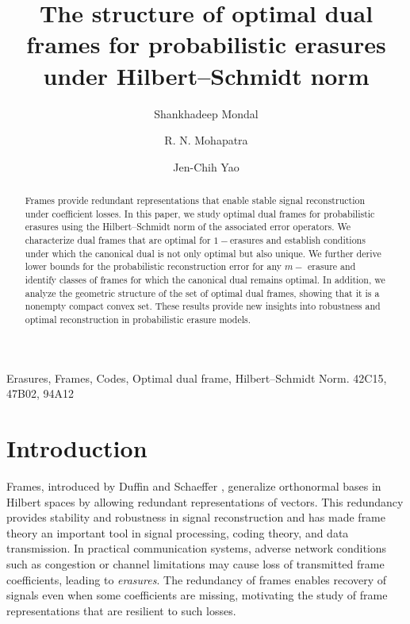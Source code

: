 \documentclass[final,1p,times]{elsarticle}
\begin{document}
\begin{frontmatter}



\title{The structure of optimal dual frames for probabilistic erasures under  Hilbert--Schmidt norm }


\author[shan]{Shankhadeep Mondal}
\author[ram]{R. N. Mohapatra}
\author[yao]{Jen-Chih Yao}




\address{Department of Mathematics, University of Central Florida}
\address{Department of Mathematics, University of Central Florida}
\address{Center for General Education, China Medical University, Taichung, Taiwan}





\begin{abstract}
Frames provide redundant representations that enable stable signal reconstruction under coefficient losses. In this paper, we study optimal dual frames for probabilistic erasures using the Hilbert--Schmidt norm of the associated error operators. We characterize dual frames that are optimal for  $1-$erasures and establish conditions under which the canonical dual is not only optimal but also unique. We further derive lower bounds for the probabilistic reconstruction error for any $m-$ erasure and identify classes of frames for which the canonical dual remains optimal. In addition, we analyze the geometric structure of the set of optimal dual frames, showing that it is a nonempty compact convex set. These results provide new insights into robustness and optimal reconstruction in probabilistic erasure models.
\end{abstract}
\begin{keyword}
			Erasures, Frames, Codes, Optimal dual frame, Hilbert–Schmidt Norm.
			\MSC[2010] 42C15, 47B02, 94A12
		\end{keyword}

\end{frontmatter}

\section{Introduction}

Frames, introduced by Duffin and Schaeffer \cite{duff}, generalize orthonormal bases in Hilbert spaces by allowing redundant representations of vectors. This redundancy provides stability and robustness in signal reconstruction and has made frame theory an important tool in signal processing, coding theory, and data transmission. In practical communication systems, adverse network conditions such as congestion or channel limitations may cause loss of transmitted frame coefficients, leading to \emph{erasures}. The redundancy of frames enables recovery of signals even when some coefficients are missing, motivating the study of frame representations that are resilient to such losses.
\end{document}
